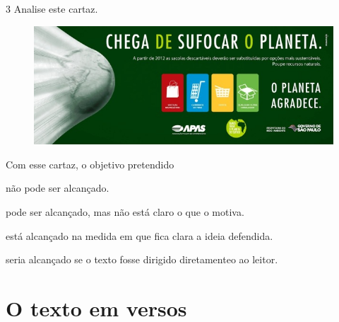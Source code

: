 \pagebreak
\num{3} Analise este cartaz.


\begin{figure}[htpb!]
\includegraphics[width=\textwidth]{./media/image14.jpeg}
\end{figure}


Com esse cartaz, o objetivo pretendido

\begin{escolha}
\item não pode ser alcançado.

\item pode ser alcançado, mas não está claro o que o motiva.

\item está alcançado na medida em que fica clara a ideia defendida.

\item seria alcançado se o texto fosse dirigido diretamenteo ao leitor.
\end{escolha}

\chapter{O texto em versos}


